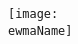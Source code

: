 \documentclass{article}
\begin{document}
\begin{figure}
	\begin{center}
		\texttt{[image: \\ewmaName]}
	\end{center}
\end{figure}

\end{document}
